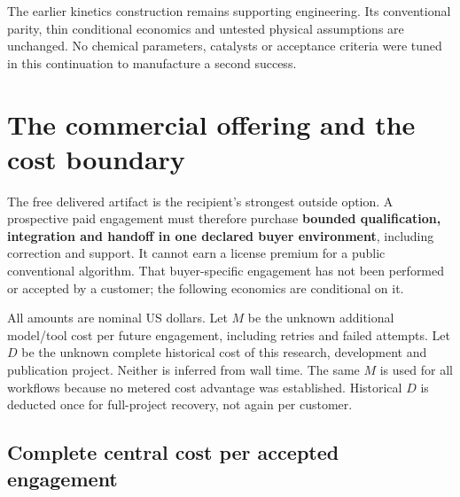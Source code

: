 \documentclass[
  10pt,
]{article}
\newcommand{\editionbreak}{\par\bigskip\Needspace{8\baselineskip}}
\begin{document}
The earlier kinetics construction remains supporting engineering. Its
conventional parity, thin conditional economics and untested physical
assumptions are unchanged. No chemical parameters, catalysts or
acceptance criteria were tuned in this continuation to manufacture a
second success.

\editionbreak

\hypertarget{the-commercial-offering-and-the-cost-boundary}{%
\section{The commercial offering and the cost
boundary}\label{the-commercial-offering-and-the-cost-boundary}}

The free delivered artifact is the recipient's strongest outside option.
A prospective paid engagement must therefore purchase \textbf{bounded
qualification, integration and handoff in one declared buyer
environment}, including correction and support. It cannot earn a license
premium for a public conventional algorithm. That buyer-specific
engagement has not been performed or accepted by a customer; the
following economics are conditional on it.

All amounts are nominal US dollars. Let \(M\) be the unknown additional
model/tool cost per future engagement, including retries and failed
attempts. Let \(D\) be the unknown complete historical cost of this
research, development and publication project. Neither is inferred from
wall time. The same \(M\) is used for all workflows because no metered
cost advantage was established. Historical \(D\) is deducted once for
full-project recovery, not again per customer.

\hypertarget{complete-central-cost-per-accepted-engagement}{%
\subsection{Complete central cost per accepted
engagement}\label{complete-central-cost-per-accepted-engagement}}
\end{document}
